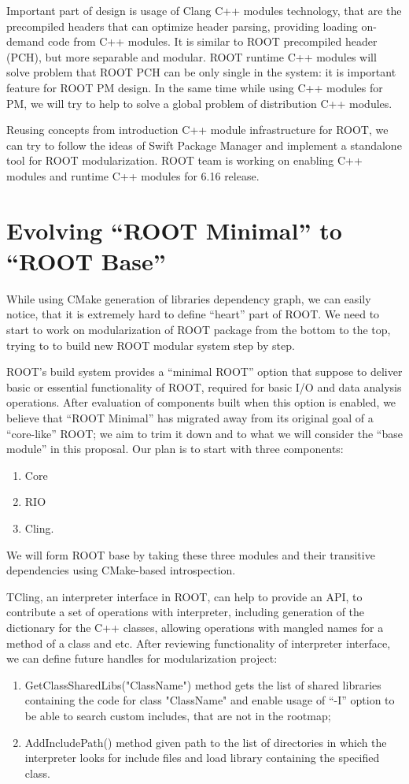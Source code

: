 \documentclass{webofc}
\begin{document}
Important part of design is usage of Clang C++ modules technology, that are the precompiled headers that can optimize header parsing, providing loading on-demand code from C++ modules. It is similar to ROOT precompiled header (PCH), but more separable and modular. ROOT runtime C++ modules will solve problem that ROOT PCH can be only single in the system: it is important feature for ROOT PM design. In the same time while using C++ modules for PM, we will try to help to solve a global problem of distribution C++ modules.
 
Reusing concepts from introduction C++ module infrastructure for ROOT, we can try to follow the ideas of Swift Package Manager and implement a standalone tool for ROOT modularization. ROOT team is working on enabling C++ modules and runtime C++ modules for 6.16 release.

\section{Evolving “ROOT Minimal” to “ROOT Base”}

While using CMake generation of libraries dependency graph, we can easily notice, that it is extremely hard to define “heart” part of ROOT. We need to start to work on modularization of ROOT package from the bottom to the top, trying to to build new ROOT modular system step by step.

ROOT’s build system provides a “minimal ROOT” option that suppose to deliver basic or essential functionality of ROOT, required for basic I/O and data analysis operations.
After evaluation of components built when this option is enabled, we believe that “ROOT Minimal” has migrated away from its original goal of a “core-like” ROOT; we aim to trim it down and to what we will consider the “base module” in this proposal.
Our plan is to start with three components:
\begin{enumerate}
\item Core
\item RIO
\item Cling.
\end{enumerate}

We will form ROOT base by taking these three modules and their transitive dependencies using CMake-based introspection.

TCling, an interpreter interface in ROOT, can help to provide an API, to contribute a set of operations with interpreter, including generation of the dictionary for the C++ classes, allowing operations with mangled names for a method of a class and etc.
After reviewing functionality of interpreter interface, we can define future handles for modularization project:
\begin{enumerate}
\item GetClassSharedLibs("ClassName") method gets the list of shared libraries containing the code for class "ClassName" and enable usage of “-I” option to be able to search custom includes, that are not in the rootmap;
\item AddIncludePath() method given path to the list of directories in which the interpreter looks for include files and load library containing the specified class.
\end{enumerate}
\end{document}
